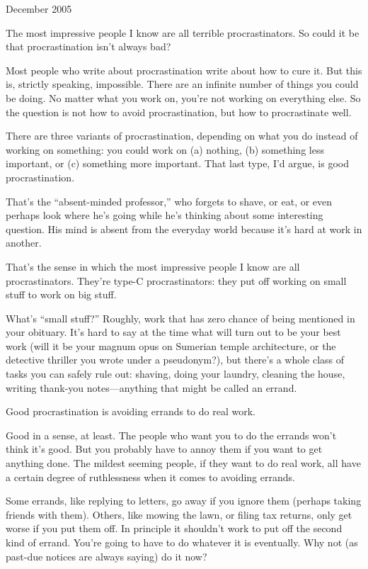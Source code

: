 December 2005

The most impressive people I know are all terrible procrastinators. So
could it be that procrastination isn't always bad?

Most people who write about procrastination write about how to cure it.
But this is, strictly speaking, impossible. There are an infinite number
of things you could be doing. No matter what you work on, you're not
working on everything else. So the question is not how to avoid
procrastination, but how to procrastinate well.

There are three variants of procrastination, depending on what you do
instead of working on something: you could work on (a) nothing, (b)
something less important, or (c) something more important. That last
type, I'd argue, is good procrastination.

That's the ``absent-minded professor,'' who forgets to shave, or eat, or
even perhaps look where he's going while he's thinking about some
interesting question. His mind is absent from the everyday world because
it's hard at work in another.

That's the sense in which the most impressive people I know are all
procrastinators. They're type-C procrastinators: they put off working on
small stuff to work on big stuff.

What's ``small stuff?'' Roughly, work that has zero chance of being
mentioned in your obituary. It's hard to say at the time what will turn
out to be your best work (will it be your magnum opus on Sumerian temple
architecture, or the detective thriller you wrote under a pseudonym?),
but there's a whole class of tasks you can safely rule out: shaving,
doing your laundry, cleaning the house, writing thank-you
notes---anything that might be called an errand.

Good procrastination is avoiding errands to do real work.

Good in a sense, at least. The people who want you to do the errands
won't think it's good. But you probably have to annoy them if you want
to get anything done. The mildest seeming people, if they want to do
real work, all have a certain degree of ruthlessness when it comes to
avoiding errands.

Some errands, like replying to letters, go away if you ignore them
(perhaps taking friends with them). Others, like mowing the lawn, or
filing tax returns, only get worse if you put them off. In principle it
shouldn't work to put off the second kind of errand. You're going to
have to do whatever it is eventually. Why not (as past-due notices are
always saying) do it now?

